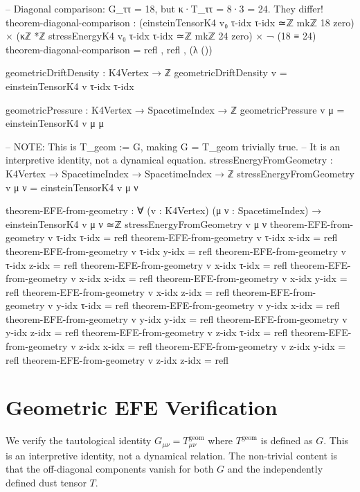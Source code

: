 \documentclass[11pt,a4paper]{book}
\begin{document}
\begin{code}
-- Diagonal comparison: G_ττ = 18, but κ·T_ττ = 8·3 = 24. They differ!
theorem-diagonal-comparison : 
  (einsteinTensorK4 v₀ τ-idx τ-idx ≃ℤ mkℤ 18 zero) × 
  (κℤ *ℤ stressEnergyK4 v₀ τ-idx τ-idx ≃ℤ mkℤ 24 zero) ×
  ¬ (18 ≡ 24)
theorem-diagonal-comparison = refl , refl , (λ ())

geometricDriftDensity : K4Vertex → ℤ
geometricDriftDensity v = einsteinTensorK4 v τ-idx τ-idx

geometricPressure : K4Vertex → SpacetimeIndex → ℤ
geometricPressure v μ = einsteinTensorK4 v μ μ

-- NOTE: This is T_geom := G, making G = T_geom trivially true.
-- It is an interpretive identity, not a dynamical equation.
stressEnergyFromGeometry : K4Vertex → SpacetimeIndex → SpacetimeIndex → ℤ
stressEnergyFromGeometry v μ ν = 
  einsteinTensorK4 v μ ν

theorem-EFE-from-geometry : ∀ (v : K4Vertex) (μ ν : SpacetimeIndex) →
  einsteinTensorK4 v μ ν ≃ℤ stressEnergyFromGeometry v μ ν
theorem-EFE-from-geometry v τ-idx τ-idx = refl
theorem-EFE-from-geometry v τ-idx x-idx = refl
theorem-EFE-from-geometry v τ-idx y-idx = refl
theorem-EFE-from-geometry v τ-idx z-idx = refl
theorem-EFE-from-geometry v x-idx τ-idx = refl
theorem-EFE-from-geometry v x-idx x-idx = refl
theorem-EFE-from-geometry v x-idx y-idx = refl
theorem-EFE-from-geometry v x-idx z-idx = refl
theorem-EFE-from-geometry v y-idx τ-idx = refl
theorem-EFE-from-geometry v y-idx x-idx = refl
theorem-EFE-from-geometry v y-idx y-idx = refl
theorem-EFE-from-geometry v y-idx z-idx = refl
theorem-EFE-from-geometry v z-idx τ-idx = refl
theorem-EFE-from-geometry v z-idx x-idx = refl
theorem-EFE-from-geometry v z-idx y-idx = refl
theorem-EFE-from-geometry v z-idx z-idx = refl
\end{code}

\section{Geometric EFE Verification}

We verify the tautological identity $G_{\mu\nu} = T^{\text{geom}}_{\mu\nu}$
where $T^{\text{geom}}$ is defined as $G$. This is an interpretive identity,
not a dynamical relation. The non-trivial content is that the off-diagonal
components vanish for both $G$ and the independently defined dust tensor $T$.
\end{document}
